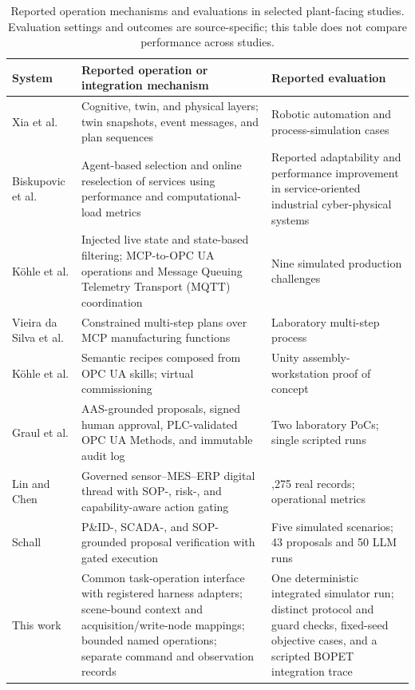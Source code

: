 \begin{table}[!t]
\centering
\caption{Reported operation mechanisms and evaluations in selected
plant-facing studies. Evaluation settings and outcomes are source-specific;
this table does not compare performance across studies.}
\label{tab:nearest}
\small
\setlength{\tabcolsep}{3pt}
\begin{tabularx}{\textwidth}{@{}>{\raggedright\arraybackslash}p{1.8cm}>{\raggedright\arraybackslash}p{7.0cm}>{\raggedright\arraybackslash}X@{}}
\toprule
System & Reported operation or integration mechanism & Reported evaluation \\
\midrule
Xia et al. \cite{xia2025architecture} & Cognitive, twin, and physical layers; twin snapshots, event messages, and plan sequences & Robotic automation and process-simulation cases \\
Biskupovic et al. \cite{biskupovic2025supervision} & Agent-based selection and online reselection of services using performance and computational-load metrics & Reported adaptability and performance improvement in service-oriented industrial cyber-physical systems \\
K{\"o}hle et al. \cite{koehle2026llmdriven} & Injected live state and state-based filtering; MCP-to-OPC UA operations and Message Queuing Telemetry Transport (MQTT) coordination & Nine simulated production challenges \\
Vieira da Silva et al. \cite{silva2025mcpmanufacturing} & Constrained multi-step plans over MCP manufacturing functions & Laboratory multi-step process \\
K{\"o}hle et al. \cite{koehle2025semanticrecipes} & Semantic recipes composed from OPC UA skills; virtual commissioning & Unity assembly-workstation proof of concept \\
Graul et al. \cite{graul2026aas} & AAS-grounded proposals, signed human approval, PLC-validated OPC UA Methods, and immutable audit log & Two laboratory PoCs; single scripted runs \\
Lin and Chen \cite{lin2026agentic} & Governed sensor--MES--ERP digital thread with SOP-, risk-, and capability-aware action gating & 25,275 real records; operational metrics \\
Schall \cite{schall2026safe} & P\&ID-, SCADA-, and SOP-grounded proposal verification with gated execution & Five simulated scenarios; 43 proposals and 50 LLM runs \\
\midrule
This work & Common task-operation interface with registered harness adapters; scene-bound context and acquisition/write-node mappings; bounded named operations; separate command and observation records & One deterministic integrated simulator run; distinct protocol and guard checks, fixed-seed objective cases, and a scripted BOPET integration trace \\
\bottomrule
\end{tabularx}
\end{table}

